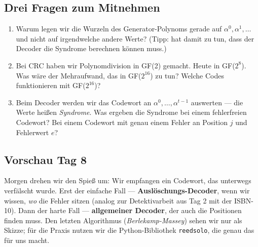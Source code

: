 \subsection*{Drei Fragen zum Mitnehmen}

\begin{enumerate}
\item Warum legen wir die Wurzeln des Generator-Polynoms gerade auf
  $\alpha^0, \alpha^1, \dots$ und nicht auf irgendwelche andere Werte?
  (Tipp: hat damit zu tun, dass der Decoder die Syndrome berechnen
  können muss.)
\item Bei CRC haben wir Polynomdivision in GF(2) gemacht. Heute in
  GF($2^8$). Was wäre der Mehraufwand, das in GF($2^{16}$) zu tun?
  Welche Codes funktionieren mit GF($2^{16}$)?
\item Beim Decoder werden wir das Codewort an $\alpha^0, \dots,
  \alpha^{t-1}$ auswerten — die Werte heißen \emph{Syndrome}. Was
  ergeben die Syndrome bei einem fehlerfreien Codewort? Bei einem
  Codewort mit genau einem Fehler an Position $j$ und
  Fehlerwert $e$?
\end{enumerate}

\subsection*{Vorschau Tag 8}

Morgen drehen wir den Spieß um: Wir empfangen ein Codewort, das
unterwegs verfälscht wurde. Erst der einfache Fall —
\textbf{Auslöschungs-Decoder}, wenn wir wissen, \emph{wo} die Fehler
sitzen (analog zur Detektivarbeit aus Tag 2 mit der ISBN-10). Dann
der harte Fall — \textbf{allgemeiner Decoder}, der auch die
Positionen finden muss. Den letzten Algorithmus
(\emph{Berlekamp-Massey}) sehen wir nur als Skizze; für die Praxis
nutzen wir die Python-Bibliothek \texttt{reedsolo}, die genau das
für uns macht.
